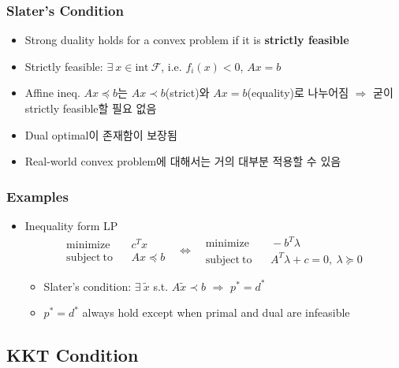 \subsubsection*{Slater's Condition}
\begin{itemize}
    \item Strong duality holds for a convex problem if it is \textbf{strictly feasible}
    \item Strictly feasible: $\exists~x\in\mathrm{int}~\mathcal{F}$, i.e. $f_i(x)<0$, $Ax=b$
    \item Affine ineq. $Ax\preceq b$는 $Ax\prec b$(strict)와 $Ax=b$(equality)로 나누어짐 $\Rightarrow$ 굳이 strictly feasible할 필요 없음
    \item Dual optimal이 존재함이 보장됨
    \item Real-world convex problem에 대해서는 거의 대부분 적용할 수 있음
\end{itemize}

\subsubsection*{Examples}
\begin{itemize}
    \item Inequality form LP
    \begin{equation}\begin{aligned}
        \mathrm{minimize}~~&~~c^Tx \\
        \mathrm{subject~to}~~&~~Ax\preceq b
    \end{aligned}~~~\Leftrightarrow~~~\begin{aligned}
        \mathrm{minimize}~~&~~-b^T\lambda \\
        \mathrm{subject~to}~~&~~A^T\lambda+c=0,~\lambda\succeq 0
    \end{aligned}\end{equation}
    \begin{itemize}
        \item Slater's condition: $\exists~\tilde{x}$ s.t. $A\tilde{x}\prec b$ $\Rightarrow$ $p^\ast=d^\ast$
        \item $p^\ast=d^\ast$ always hold except when primal and dual are infeasible
    \end{itemize}
\end{itemize}

\subsection{KKT Condition}
